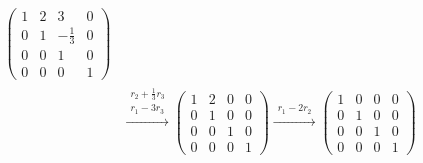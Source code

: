 \documentclass[a4paper]{report}
\begin{document}
\begin{jie}
\begin{align*}
{
\begin{pmatrix}
1&2&3&0\\
0&1&-\frac{1}{3}&0\\
0&0&1&0\\
0&0&0&1
\end{pmatrix}
}\\ &\xrightarrow{\substack{r_{2}+\frac{1}{3}r_{3}\\ r_{1}-3r_{3}}}
{
\begin{pmatrix}
1&2&0&0\\
0&1&0&0\\
0&0&1&0\\
0&0&0&1
\end{pmatrix}
}\xrightarrow{\substack{r_{1}-2r_{2}}}
{
\begin{pmatrix}
1&0&0&0\\
0&1&0&0\\
0&0&1&0\\
0&0&0&1
\end{pmatrix}
}
\end{align*}
\end{jie}
\end{document}

